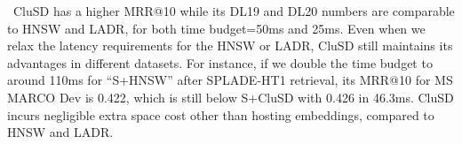 \textbullet\ 
CluSD has a higher MRR@10 while its DL19 and DL20 numbers are comparable to HNSW and LADR,
for both time budget=50ms and 25ms.  
Even when we relax the latency requirements for the HNSW or LADR, CluSD still maintains its advantages in different datasets. 
For instance, if we double the time budget to around  110ms
for 	``S+HNSW'' after  SPLADE-HT1 retrieval, its MRR@10 for MS MARCO Dev is 0.422, which is still below S$+$CluSD with 0.426 in 46.3ms.
CluSD incurs negligible extra space cost other than hosting embeddings, compared to HNSW and LADR.




 





